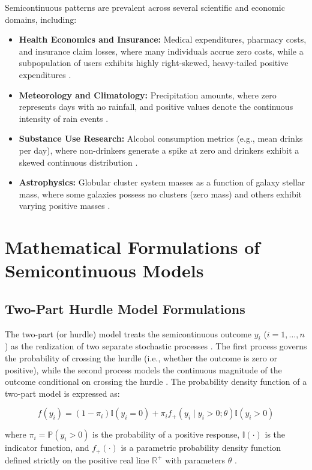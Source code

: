 \documentclass[11pt, a4paper]{article}
\begin{document}
Semicontinuous patterns are prevalent across several scientific and economic domains, including:
\begin{itemize}
    \item \textbf{Health Economics and Insurance:} Medical expenditures, pharmacy costs, and insurance claim losses, where many individuals accrue zero costs, while a subpopulation of users exhibits highly right-skewed, heavy-tailed positive expenditures \cite{ref1, ref6, ref9}.
    \item \textbf{Meteorology and Climatology:} Precipitation amounts, where zero represents days with no rainfall, and positive values denote the continuous intensity of rain events \cite{ref2, ref9}.
    \item \textbf{Substance Use Research:} Alcohol consumption metrics (e.g., mean drinks per day), where non-drinkers generate a spike at zero and drinkers exhibit a skewed continuous distribution \cite{ref2, ref7, ref16}.
    \item \textbf{Astrophysics:} Globular cluster system masses as a function of galaxy stellar mass, where some galaxies possess no clusters (zero mass) and others exhibit varying positive masses \cite{ref4}.
\end{itemize}

\section{Mathematical Formulations of Semicontinuous Models}

\subsection{Two-Part Hurdle Model Formulations}
The two-part (or hurdle) model treats the semicontinuous outcome $y_i$ ($i = 1, \dots, n$) as the realization of two separate stochastic processes \cite{ref2, ref7, ref8}. The first process governs the probability of crossing the hurdle (i.e., whether the outcome is zero or positive), while the second process models the continuous magnitude of the outcome conditional on crossing the hurdle \cite{ref4, ref5, ref8}. The probability density function of a two-part model is expressed as:

\begin{equation}
f(y_i) = (1 - \pi_i)\mathbb{I}(y_i = 0) + \pi_i f_+(y_i \mid y_i > 0; \theta)\mathbb{I}(y_i > 0)
\end{equation}

where $\pi_i = \mathbb{P}(y_i > 0)$ is the probability of a positive response, $\mathbb{I}(\cdot)$ is the indicator function, and $f_+(\cdot)$ is a parametric probability density function defined strictly on the positive real line $\mathbb{R}^+$ with parameters $\theta$ \cite{ref1, ref2, ref8}. 
\end{document}
